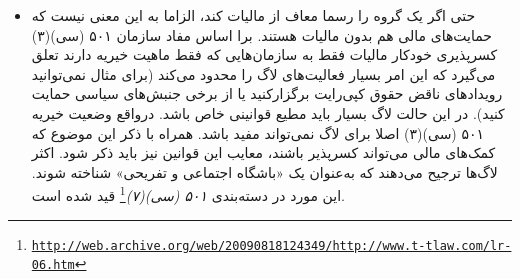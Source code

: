 \begin{itemize}
\emph{پوشش بیمه طرح دعوی در دادگاه یا چتر بیمه}\footnote{\texttt{\url{https://en.wikipedia.org/wiki/Umbrella_insurance}}}
بسیار گران است. لاگ نمی‌تواند داوطلبان را تحت پوشش این بیمه قرار دهد و
از پس هزینه‌های سنگین آن بر نخواهد آمد. حتی اگر بتواند آن را اخذ کند.
برای اینکه یک میلیون دلار بیمه پوشش مسئولیت خریداری کنید، سالیانه باید
۲۵۰۰ دلار پرداخت کنید. البته با این مبلغ تنها رهبران و مدیران اصلی را تحت
پوشش قرار می‌دهد و کاملا وظایف محدودی را انجام خواهد داد.

\item
حتی اگر  یک گروه را رسما معاف از مالیات کند، الزاما به این معنی نیست
که حمایت‌های مالی هم بدون مالیات هستند. برا اساس مفاد سازمان ۵۰۱ (سی)(۳) کسرپذیری
خودکار مالیات فقط به سازمان‌هایی که فقط ماهیت خیریه دارند تعلق می‌گیرد که این امر
بسیار فعالیت‌های لاگ را محدود می‌کند (برای مثال نمی‌توانید رویدادهای ناقض حقوق کپی‌رایت
برگزارکنید یا از برخی جنبش‌های سیاسی حمایت کنید). در این حالت لاگ بسیار باید مطیع قوانینی
خاص باشد. درواقع وضعیت خیریه ۵۰۱ (سی)(۳) اصلا برای لاگ نمی‌تواند مفید باشد.
همراه با ذکر این موضوع که کمک‌های مالی می‌تواند کسرپذیر باشند، معایب این قوانین نیز
باید ذکر شود. اکثر لاگ‌ها ترجیح می‌دهند که به‌عنوان یک «باشگاه اجتماعی و تفریحی» شناخته شوند.
این مورد در دسته‌بندی
\emph{۵۰۱ (سی)(۷)}\footnote{\texttt{\url{http://web.archive.org/web/20090818124349/http://www.t-tlaw.com/lr-06.htm}}}
قید شده است.


\end{itemize}
